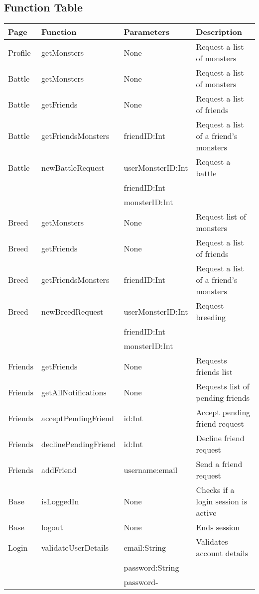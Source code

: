 \documentclass{project}
\begin{document}
\subsection{Function Table}
\begin{tabular}{|l | l | l | l |}
\hline
Page & Function & Parameters & Description \\
\hline
Profile & getMonsters & None & Request a list of monsters \\
\hline
Battle & getMonsters & None & Request a list of monsters\\
\hline
Battle & getFriends & None & Request a list of friends\\
\hline
Battle & getFriendsMonsters & friendID:Int & Request a list of a friend's monsters \\
\hline
Battle & newBattleRequest & userMonsterID:Int & Request a battle 
\\ &  & friendID:Int & 
\\ &  & monsterID:Int &
\\
\hline
Breed & getMonsters & None & Request list of monsters \\
Breed & getFriends & None & Request a list of friends\\
\hline
Breed & getFriendsMonsters & friendID:Int & Request a list of a friend's monsters\\
\hline
Breed & newBreedRequest & userMonsterID:Int & Request breeding \\ &  & friendID:Int & 
\\ &  & monsterID:Int &
\\
\hline
Friends & getFriends & None & Requests friends list 
\\
\hline
Friends & getAllNotifications & None & Requests list of pending friends
\\
\hline
Friends & acceptPendingFriend & id:Int & Accept pending friend request
\\
\hline
Friends & declinePendingFriend & id:Int & Decline friend request
\\
\hline
Friends & addFriend & username:email & Send a friend request\\
\hline
Base & isLoggedIn & None & Checks if a login session is active
\\
\hline
Base & logout & None & Ends session\\
\hline
Login & validateUserDetails & email:String & Validates account details
\\ &  & password:String & 
\\ &  & password- & \\

\end{tabular}
\end{document}
